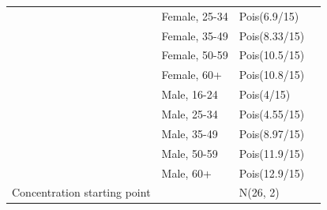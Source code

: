 \documentclass{article}
\begin{document}
\begin{appendix}
\begin{table}[H]
\begin{tabular}{l l l l}
		                             & Female, 25-34                & Pois(6.9/15)        & \citet{ONS2020} \\
		                             & Female, 35-49                & Pois(8.33/15)       & \citet{ONS2020} \\
		                             & Female, 50-59                & Pois(10.5/15)       & \citet{ONS2020} \\
		                             & Female, 60+                  & Pois(10.8/15)       & \citet{ONS2020} \\
		                             & Male, 16-24                  & Pois(4/15)          & \citet{ONS2020} \\
		                             & Male, 25-34                  & Pois(4.55/15)       & \citet{ONS2020} \\
		                             & Male, 35-49                  & Pois(8.97/15)       & \citet{ONS2020} \\
		                             & Male, 50-59                  & Pois(11.9/15)       & \citet{ONS2020} \\
		                             & Male, 60+                    & Pois(12.9/15)       & \citet{ONS2020} \\
		Concentration starting point &                              & N(26, 2)            & \citet{wallace1993indoor} \\
		\hline \hline 
	\end{tabular}
	\label{tab::closedmicro}
\end{table}

\end{appendix}
\end{document}
